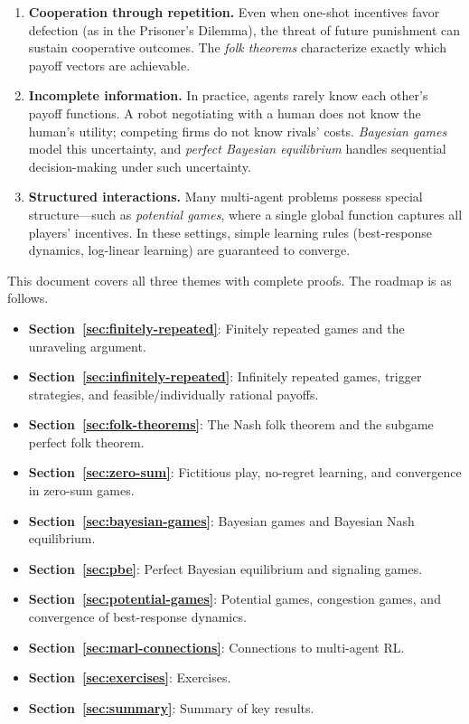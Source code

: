 \documentclass[11pt,a4paper]{article}
\theoremstyle{definition}
\theoremstyle{plain}
\theoremstyle{remark}
\begin{document}
\begin{enumerate}[label=(\roman*)]
    \item \textbf{Cooperation through repetition.} Even when one-shot incentives favor
    defection (as in the Prisoner's Dilemma), the threat of future punishment can sustain
    cooperative outcomes. The \emph{folk theorems} characterize exactly which payoff
    vectors are achievable.

    \item \textbf{Incomplete information.} In practice, agents rarely know each other's
    payoff functions. A robot negotiating with a human does not know the human's utility;
    competing firms do not know rivals' costs. \emph{Bayesian games} model this uncertainty,
    and \emph{perfect Bayesian equilibrium} handles sequential decision-making under such
    uncertainty.

    \item \textbf{Structured interactions.} Many multi-agent problems possess special
    structure---such as \emph{potential games}, where a single global function captures all
    players' incentives. In these settings, simple learning rules (best-response dynamics,
    log-linear learning) are guaranteed to converge.
\end{enumerate}

This document covers all three themes with complete proofs. The roadmap is as follows.
\begin{itemize}
    \item \textbf{Section~\ref{sec:finitely-repeated}}: Finitely repeated games and the
    unraveling argument.
    \item \textbf{Section~\ref{sec:infinitely-repeated}}: Infinitely repeated games, trigger
    strategies, and feasible/individually rational payoffs.
    \item \textbf{Section~\ref{sec:folk-theorems}}: The Nash folk theorem and the subgame
    perfect folk theorem.
    \item \textbf{Section~\ref{sec:zero-sum}}: Fictitious play, no-regret learning, and
    convergence in zero-sum games.
    \item \textbf{Section~\ref{sec:bayesian-games}}: Bayesian games and Bayesian Nash
    equilibrium.
    \item \textbf{Section~\ref{sec:pbe}}: Perfect Bayesian equilibrium and signaling games.
    \item \textbf{Section~\ref{sec:potential-games}}: Potential games, congestion games, and
    convergence of best-response dynamics.
    \item \textbf{Section~\ref{sec:marl-connections}}: Connections to multi-agent RL.
    \item \textbf{Section~\ref{sec:exercises}}: Exercises.
    \item \textbf{Section~\ref{sec:summary}}: Summary of key results.
\end{itemize}
\end{document}
